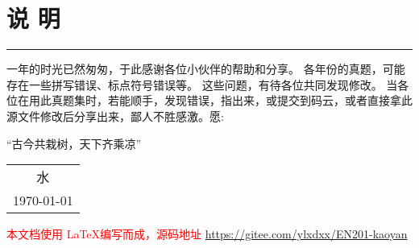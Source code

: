 




\chapter*{说 \quad 明}
\thispagestyle{empty}




\rule{2em}{0pt}一年的时光已然匆匆，于此感谢各位小伙伴的帮助和分享。
各年份的真题，可能存在一些拼写错误、标点符号错误等。
这些问题，有待各位共同发现修改。
当各位在用此真题集时，若能顺手，发现错误，指出来，或提交到码云，或者直接拿此源文件修改后分享出来，鄙人不胜感激。愿:
\begin{center}
	\kaishu 
	“古今共栽树，天下齐乘凉”
\end{center}
\begin{center}
	\flushright
	\begin{tabular}{c}
		水   \\
		\today
	\end{tabular}	
\end{center}

\vfil
\noindent
\textcolor{red}{本文档使用 \LaTeX 编写而成，源码地址 \url{https://gitee.com/ylxdxx/EN201-kaoyan}}
\vfil

\pagestyle{fancy}

